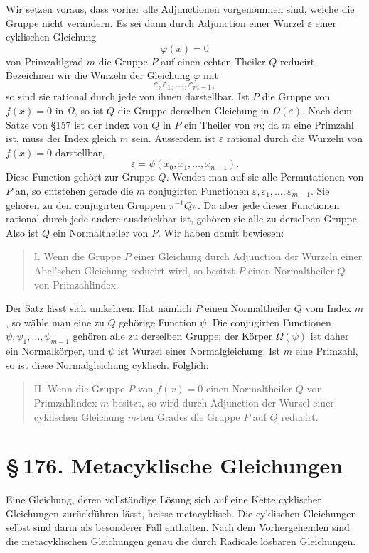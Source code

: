 \documentclass[11pt]{article}
\providecommand{\sect}[2]{\section*{\S\,#1. #2}}
\begin{document}
Wir setzen voraus, dass vorher alle Adjunctionen vorgenommen sind, welche die Gruppe nicht verändern. Es sei dann durch Adjunction einer Wurzel $\varepsilon$ einer cyklischen Gleichung
\[
        \varphi(x)=0
\]
von Primzahlgrad $m$ die Gruppe $P$ auf einen echten Theiler $Q$ reducirt. Bezeichnen wir die Wurzeln der Gleichung $\varphi$ mit
\[
        \varepsilon,
\varepsilon_1,
\ldots,
\varepsilon_{m-1},
\]
so sind sie rational durch jede von ihnen darstellbar. Ist $P$ die Gruppe von $f(x)=0$ in $\Omega$, so ist $Q$ die Gruppe derselben Gleichung in $\Omega(\varepsilon)$. Nach dem Satze von §157 ist der Index von $Q$ in $P$ ein Theiler von $m$; da $m$ eine Primzahl ist, muss der Index gleich $m$ sein. Ausserdem ist $\varepsilon$ rational durch die Wurzeln von $f(x)=0$ darstellbar,
\[
        \varepsilon=\psi(x_0,x_1,
\ldots,x_{n-1}).                       \tag{2}
\]
Diese Function gehört zur Gruppe $Q$. Wendet man auf sie alle Permutationen von $P$ an, so entstehen gerade die $m$ conjugirten Functionen $\varepsilon,
\varepsilon_1,
\ldots,
\varepsilon_{m-1}$. Sie gehören zu den conjugirten Gruppen $\pi^{-1}Q\pi$. Da aber jede dieser Functionen rational durch jede andere ausdrückbar ist, gehören sie alle zu derselben Gruppe. Also ist $Q$ ein Normaltheiler von $P$. Wir haben damit bewiesen:

\begin{quote}
I. Wenn die Gruppe $P$ einer Gleichung durch Adjunction der Wurzeln einer Abel'schen Gleichung reducirt wird, so besitzt $P$ einen Normaltheiler $Q$ von Primzahlindex.
\end{quote}

Der Satz lässt sich umkehren. Hat nämlich $P$ einen Normaltheiler $Q$ vom Index $m$, so wähle man eine zu $Q$ gehörige Function $\psi$. Die conjugirten Functionen $\psi,
\psi_1,
\ldots,
\psi_{m-1}$ gehören alle zu derselben Gruppe; der Körper $\Omega(\psi)$ ist daher ein Normalkörper, und $\psi$ ist Wurzel einer Normalgleichung. Ist $m$ eine Primzahl, so ist diese Normalgleichung cyklisch. Folglich:

\begin{quote}
II. Wenn die Gruppe $P$ von $f(x)=0$ einen Normaltheiler $Q$ von Primzahlindex $m$ besitzt, so wird durch Adjunction der Wurzel einer cyklischen Gleichung $m$-ten Grades die Gruppe $P$ auf $Q$ reducirt.
\end{quote}

\sect{176}{Metacyklische Gleichungen}

Eine Gleichung, deren vollständige Lösung sich auf eine Kette cyklischer Gleichungen zurückführen lässt, heisse metacyklisch. Die cyklischen Gleichungen selbst sind darin als besonderer Fall enthalten. Nach dem Vorhergehenden sind die metacyklischen Gleichungen genau die durch Radicale lösbaren Gleichungen.
\end{document}
